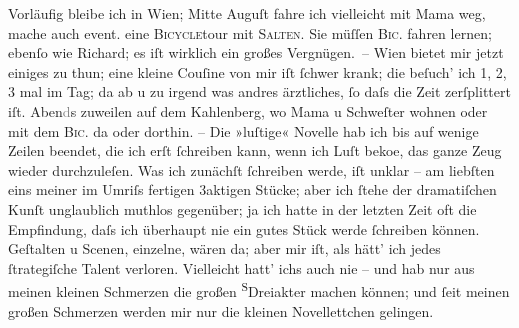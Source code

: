 \begin{ledgroupsized}[t]{13cm}
           \pstart
           Vorläufig bleibe ich in Wien; Mitte
                  Auguſt fahre ich vielleicht mit Mama weg, {\pb}mache auch event. eine
                  \textsc{Bicycle}tour mit \textsc{Salten}. Sie müſſen \textsc{Bic.} fahren lernen; ebenſo wie Richard; es iſt wirklich ein großes
               Vergnügen. –\pend
           \pstart
           Wien bietet mir jetzt einiges zu thun; eine kleine
                  Couſine von mir iſt
               ſchwer krank; die beſuch’ ich 1, 2, 3 mal im Tag; da{\geminationn} ab
               u zu irgend was andres ärztliches, ſo daſs die Zeit zerſplittert iſt.
                  Aben\textcolor{gray}{d}s zuweilen auf dem Kahlenberg, wo Mama u Schweſter
               wohnen oder mit dem \textsc{Bic.} da oder dorthin.\pend
           \pstart
           {\pb}– Die »luſtige« Novelle hab ich bis auf wenige Zeilen beendet, die ich erſt
               ſchreiben kann, wenn ich Luſt beko{\geminationm}e, das ganze Zeug
               wieder durchzuleſen. Was ich zunächſt ſchreiben werde, iſt unklar – am liebſten eins
               meiner im Umriſs fertigen 3aktigen Stücke; aber ich ſtehe der dramatiſchen Kunſt
               unglaublich muthlos gegenüber; ja ich hatte in der letzten Zeit oft die Empfindung,
               daſs ich überhaupt nie {\pb}ein gutes Stück werde ſchreiben
               können. Geſtalten u Scenen, einzelne, wären da; aber mir iſt, als hätt’ ich jedes
               ſtrategiſche Talent verloren. Vielleicht hatt’ ichs auch nie – und hab nur aus meinen
               kleinen Schmerzen die großen \substVorne{}\textsuperscript{S}\substDazwischen{}D\substHinten{}reiakter machen können; und ſeit meinen großen Schmerzen  werden mir nur die kleinen Novellettchen gelingen.

\end{ledgroupsized}

